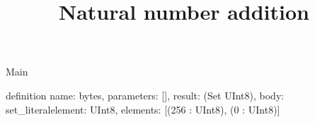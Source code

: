 \begin{lexlean}{Main}
\title{Natural number addition}
\begin{semanticmodule}
definition{
  name: bytes,
  parameters: [],
  result: (Set UInt8),
  body: set_literal{element: UInt8, elements: [(256 : UInt8), (0 : UInt8)]}
}
\end{semanticmodule}
\end{lexlean}
